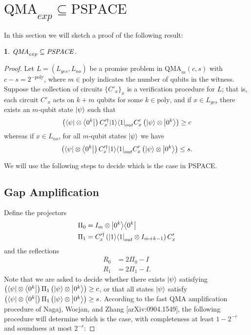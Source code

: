 \documentclass[english]{article}
\numberwithin{equation}{section}
\numberwithin{figure}{section}
\theoremstyle{plain}
\newtheorem{thm}{\protect\theoremname}
\theoremstyle{definition}
\theoremstyle{plain}
\theoremstyle{definition}
\theoremstyle{remark}
\theoremstyle{remark}
\theoremstyle{plain}
\providecommand{\theoremname}{Theorem}
\begin{document}
\section{$\text{QMA}_{exp} \subseteq \text{PSPACE}$}
In this section we will sketch a proof of the following result:
\begin{thm}
$\text{\emph{QMA}}_{exp} \subseteq \text{\emph{PSPACE}}$.
\end{thm}
\begin{proof}
Let $L = (L_{yes},L_{no})$ be a promise problem in $\text{QMA}_m(c,s)$ with $c - s = 2^{-\text{poly}}$, where $m \in \text{poly}$ indicates the number of qubits in the witness. Suppose the collection of circuits $\{C'_x\}_x$ is a verification procedure for $L$; that is, each circuit $C'_x$ acts on $k+m$ qubits for some $k \in \text{poly}$, and if $x \in L_{yes}$ there exists an $m$-qubit state ${\left\vert{\psi}\right\rangle}$ such that
\begin{equation}
\left({\left\langle{\psi}\right\vert}\otimes {\left\langle{0^k}\right\vert}\right) C'^\dagger_x {\left\vert{1}\right\rangle}{\left\langle{1}\right\vert}_{out} C'_x \left({\left\vert{\psi}\right\rangle}\otimes {\left\vert{0^k}\right\rangle}\right) \ge c
\end{equation}
whereas if $x \in L_{no}$, for all $m$-qubit states ${\left\vert{\psi}\right\rangle}$ we have
\begin{equation}
\left({\left\langle{\psi}\right\vert}\otimes {\left\langle{0^k}\right\vert}\right) C'^\dagger_x {\left\vert{1}\right\rangle}{\left\langle{1}\right\vert}_{out} C'_x \left({\left\vert{\psi}\right\rangle}\otimes {\left\vert{0^k}\right\rangle}\right) \le s.
\end{equation}

We will use the following steps to decide which is the case in PSPACE.

\subsection{Gap Amplification}

Define the projectors
\begin{align}
\Pi_0 &= I_m \otimes {\left\vert{0^k}\right\rangle}{\left\langle{0^k}\right\vert} \\
\Pi_1 &= C'^\dagger_x \left({\left\vert{1}\right\rangle}{\left\langle{1}\right\vert}_{out} \otimes I_{m+k-1}\right) C'_x
\end{align}
and the reflections
\begin{align}
R_0 &= 2\Pi_0 - I \\
R_1 &= 2\Pi_1 - I.
\end{align}
Note that we are asked to decide whether there exists ${\left\vert{\psi}\right\rangle}$ satisfying $\left({\left\langle{\psi}\right\vert}\otimes {\left\langle{0^k}\right\vert}\right) \Pi_1 \left({\left\vert{\psi}\right\rangle}\otimes {\left\vert{0^k}\right\rangle}\right) \ge c$, or that all states ${\left\vert{\psi}\right\rangle}$ satisfy $\left({\left\langle{\psi}\right\vert}\otimes {\left\langle{0^k}\right\vert}\right) \Pi_1 \left({\left\vert{\psi}\right\rangle}\otimes {\left\vert{0^k}\right\rangle}\right) \ge s$.
According to the fast QMA amplification procedure of Nagaj, Wocjan, and Zhang [arXiv:0904.1549], the following procedure will determine which is the case, with completeness at least $1-2^{-r}$ and soundness at most $2^{-r}$:


\end{proof}
\end{document}
